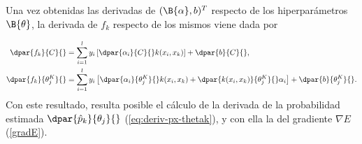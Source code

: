 Una vez obtenidas las derivadas de $({\B{\alpha},b})^T$ respecto de
los hiperparámetros $\B{\theta}$, la derivada de $f_k$  respecto
de los mismos viene dada por

\begin{align}
  \dpar{f_k}{C}{} &=  \sum_{i=1}^l y_i\left[
    \dpar{\alpha_i}{C}{} k(x_i,x_k) \right]
  + \dpar{b}{C}{} ,\\
  \dpar{f_k}{\theta^K_j}{} &=  \sum_{i=1}^l y_i \left[
    \dpar{\alpha_i}{\theta^K_j}{} k(x_i,x_k) +
    \dpar{k(x_i,x_k)}{\theta^K_j}{} \alpha_i \right]
  + \dpar{b}{\theta^K_j}{}. 
\end{align}
Con este resultado, resulta posible el cálculo de la derivada de la
probabilidad estimada $\dpar{\hat{p}_k}{\theta_j}{}$
(\autoref{eq:deriv-px-thetak}), y con ella la del gradiente
$\nabla{}E$ (\autoref{gradE}).
